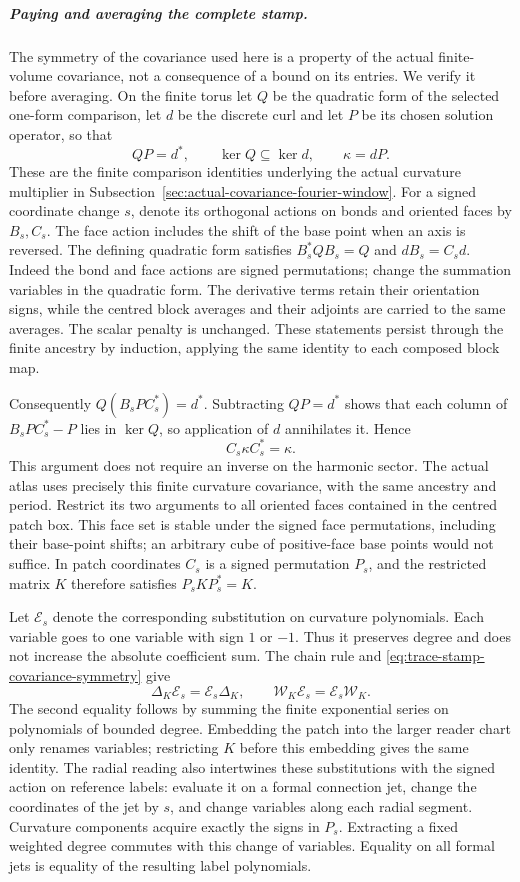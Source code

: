 \subparagraph{Paying and averaging the complete stamp.}
The symmetry of the covariance used here is a property of the actual
finite-volume covariance, not a consequence of a bound on its entries.
We verify it before averaging. On the finite torus let $Q$ be the
quadratic form of the selected one-form comparison, let $d$ be the
discrete curl and let $P$ be its chosen solution operator, so that
\[
 QP=d^*,\qquad \ker Q\subseteq\ker d,\qquad \kappa=dP.
\]
These are the finite comparison identities underlying the actual
curvature multiplier in
Subsection~\ref{sec:actual-covariance-fourier-window}. For a signed coordinate
change $s$, denote its orthogonal actions on bonds and oriented faces
by $B_s,C_s$. The face action includes the shift of the base point when
an axis is reversed. The defining quadratic form satisfies
$B_s^*QB_s=Q$ and $dB_s=C_sd$. Indeed the bond and face actions are
signed permutations; change the summation variables in the quadratic
form. The derivative terms retain their orientation signs, while the
centred block averages and their adjoints are carried to the same
averages. The scalar penalty is unchanged. These statements persist
through the finite ancestry by induction, applying the same identity
to each composed block map.

Consequently $Q(B_sPC_s^*)=d^*$. Subtracting $QP=d^*$ shows that
each column of $B_sPC_s^*-P$ lies in $\ker Q$, so application of $d$
annihilates it. Hence
\begin{equation}\label{eq:trace-stamp-covariance-symmetry}
 C_s\kappa C_s^*=\kappa.
\end{equation}
This argument does not require an inverse on the harmonic sector.
The actual atlas uses precisely this finite curvature covariance,
with the same ancestry and period. Restrict its two arguments to all
oriented faces contained in the centred patch box. This face set is
stable under the signed face permutations, including their base-point
shifts; an arbitrary cube of positive-face base points would not suffice. In patch
coordinates $C_s$ is a signed permutation $P_s$, and the restricted
matrix $K$ therefore satisfies $P_sKP_s^*=K$.

Let $\mathcal E_s$ denote the corresponding substitution on curvature
polynomials. Each variable goes to one variable with sign $1$ or $-1$.
Thus it preserves degree and does not increase the absolute coefficient
sum. The chain rule and \eqref{eq:trace-stamp-covariance-symmetry} give
\[
 \Delta_K\mathcal E_s=\mathcal E_s\Delta_K,
 \qquad \mathcal W_K\mathcal E_s
                    =\mathcal E_s\mathcal W_K.
\]
The second equality follows by summing the finite exponential series on
polynomials of bounded degree. Embedding the patch into the larger
reader chart only renames variables; restricting $K$ before this
embedding gives the same identity. The radial reading also intertwines
these substitutions with the signed action on reference labels:
evaluate it on a formal connection jet, change the coordinates of the
jet by $s$, and change variables along each radial segment. Curvature
components acquire exactly the signs in $P_s$. Extracting a fixed
weighted degree commutes with this change of variables. Equality on
all formal jets is equality of the resulting label polynomials.

